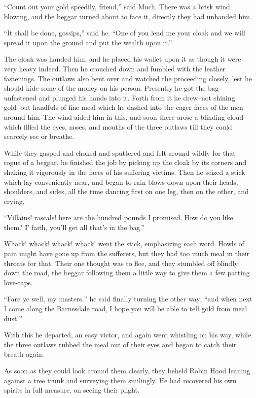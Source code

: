 ``Count out your gold speedily, friend,'' said Much. There was a brisk
wind blowing, and the beggar turned about to face it, directly they had
unhanded him.

``It shall be done, gossips,'' said he. ``One of you lend me your cloak
and we will spread it upon the ground and put the wealth upon it.''

The cloak was handed him, and he placed his wallet upon it as though it
were very heavy indeed. Then he crouched down and fumbled with the
leather fastenings. The outlaws also bent over and watched the
proceeding closely, lest he should hide some of the money on his person.
Presently he got the bag unfastened and plunged his hands into it. Forth
from it he drew--not shining gold--but handfuls of fine meal which he
dashed into the eager faces of the men around him. The wind aided him in
this, and soon there arose a blinding cloud which filled the eyes,
noses, and mouths of the three outlaws till they could scarcely see or
breathe.

While they gasped and choked and sputtered and felt around wildly for
that rogue of a beggar, he finished the job by picking up the cloak by
its corners and shaking it vigorously in the faces of his suffering
victims. Then he seized a stick which lay conveniently near, and began
to rain blows down upon their heads, shoulders, and sides, all the time
dancing first on one leg, then on the other, and crying,

``Villains! rascals! here are the hundred pounds I promised. How do you
like them? I' faith, you'll get all that's in the bag.''

Whack! whack! whack! whack! went the stick, emphasizing each word. Howls
of pain might have gone up from the sufferers, but they had too much
meal in their throats for that. Their one thought was to flee, and they
stumbled off blindly down the road, the beggar following them a little
way to give them a few parting love-taps.

``Fare ye well, my masters,'' he said finally turning the other way;
``and when next I come along the Barnesdale road, I hope you will be
able to tell gold from meal dust!''

With this he departed, an easy victor, and again went whistling on his
way, while the three outlaws rubbed the meal out of their eyes and began
to catch their breath again.

As soon as they could look around them clearly, they beheld Robin Hood
leaning against a tree trunk and surveying them smilingly. He had
recovered his own spirits in full measure, on seeing their plight.


